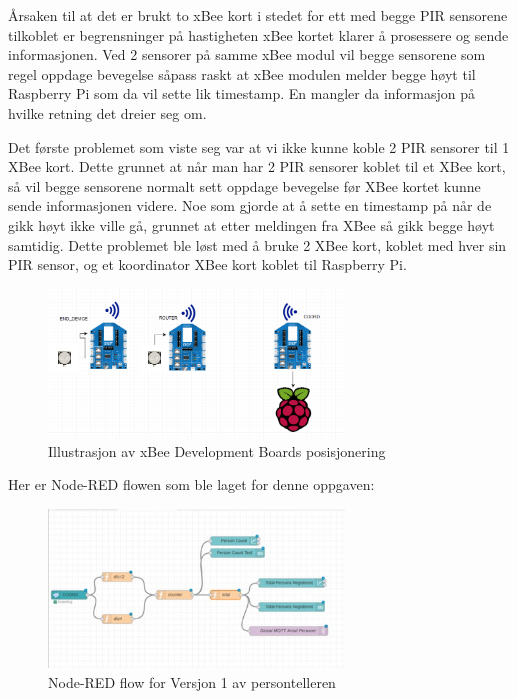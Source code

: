 \documentclass{article}
\begin{document}
Årsaken til at det er brukt to xBee kort i stedet for ett med begge PIR sensorene tilkoblet er begrensninger på hastigheten xBee kortet klarer å prosessere og sende informasjonen. Ved 2 sensorer på samme xBee modul vil begge sensorene som regel oppdage bevegelse såpass raskt at xBee modulen melder begge høyt til Raspberry Pi som da vil sette lik timestamp. En mangler da informasjon på hvilke retning det dreier seg om.  

Det første problemet som viste seg var at vi ikke kunne koble 2 PIR sensorer til 1 XBee kort. Dette grunnet at når man har 2 PIR sensorer koblet til et XBee kort, så vil begge sensorene normalt sett oppdage bevegelse før XBee kortet kunne sende informasjonen videre. Noe som gjorde at å sette en timestamp på når de gikk høyt ikke ville gå, grunnet at etter meldingen fra XBee så gikk begge høyt samtidig. Dette problemet ble løst med å bruke 2 XBee kort, koblet med hver sin PIR sensor, og et koordinator XBee kort koblet til Raspberry Pi. 

\begin{figure}[!ht]
  \centering
      \includegraphics[width=0.7\textwidth]{PIRSetup}
  \caption{Illustrasjon av xBee Development Boards posisjonering}
\end{figure}

Her er Node-RED flowen som ble laget for denne oppgaven:
\\
\begin{figure}[!ht]
  \centering
      \includegraphics[width=0.7\textwidth]{personteller1}
  \caption{Node-RED flow for Versjon 1 av persontelleren}
\end{figure}
\end{document}

